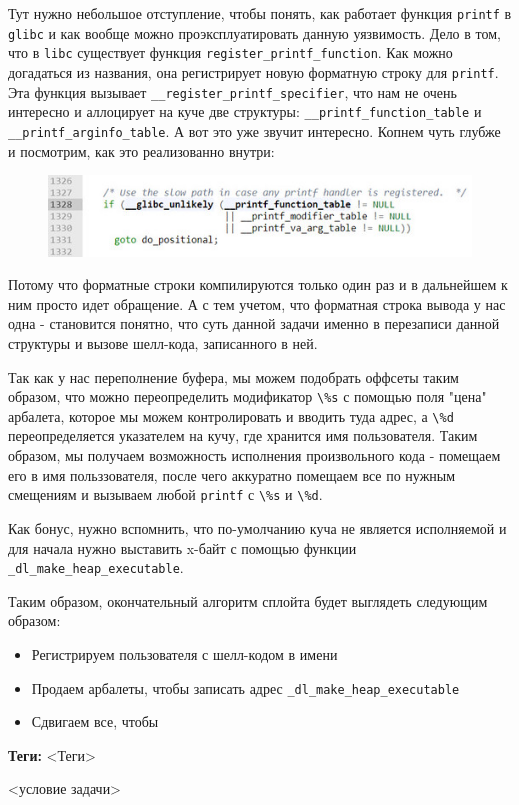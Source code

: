 \documentclass[idxtotoc,hyperref,openany,oneside]{files/pwn} %
\begin{document}
Тут нужно небольшое отступление, чтобы понять, как работает функция \verb|printf| в \verb|glibc| и как вообще можно проэксплуатировать данную уязвимость. Дело в том, что в \verb|libc| существует функция \verb|register_printf_function|. Как можно догадаться из названия, она регистрирует новую форматную строку для \verb|printf|. Эта функция вызывает \verb|__register_printf_specifier|, что нам не очень интересно и аллоцирует на куче две структуры: \verb|__printf_function_table| и \verb|__printf_arginfo_table|. А вот это уже звучит интересно. Копнем чуть глубже и посмотрим, как это реализованно внутри:
\begin{figure}[H]
\begin{center}
\includegraphics[width=1.0\linewidth]{files/heap-pft}
\end{center}
\label{fig:heap-pft}
\end{figure}

Потому что форматные строки компилируются только один раз и в дальнейшем к ним просто идет обращение. А с тем учетом, что форматная строка вывода у нас одна - становится понятно, что суть данной задачи именно в перезаписи данной структуры и вызове шелл-кода, записанного в ней.

Так как у нас переполнение буфера, мы можем подобрать оффсеты таким образом, что можно переопределить модификатор \verb|\%s| с помощью поля "цена" арбалета, которое мы можем контролировать и вводить туда адрес, а \verb|\%d| переопределяется указателем на кучу, где хранится имя пользователя. Таким образом, мы получаем возможность исполнения произвольного кода - помещаем его в имя польззователя, после чего аккуратно помещаем все по нужным смещениям и вызываем любой \verb|printf| с \verb|\%s| и \verb|\%d|.

Как бонус, нужно вспомнить, что по-умолчанию куча не является исполняемой и для начала нужно выставить x-байт с помощью функции \verb|_dl_make_heap_executable|.

Таким образом, окончательный алгоритм сплойта будет выглядеть следующим образом:
\begin{itemize}
	\item Регистрируем пользователя с шелл-кодом в имени
	\item Продаем арбалеты, чтобы записать адрес \verb|_dl_make_heap_executable|
	\item Сдвигаем все, чтобы 
\end{itemize}



\textbf{Теги:} <Теги>\vspace{\baselineskip}

\begin{tcolorbox}
<условие задачи>
\end{tcolorbox}

\end{document}
